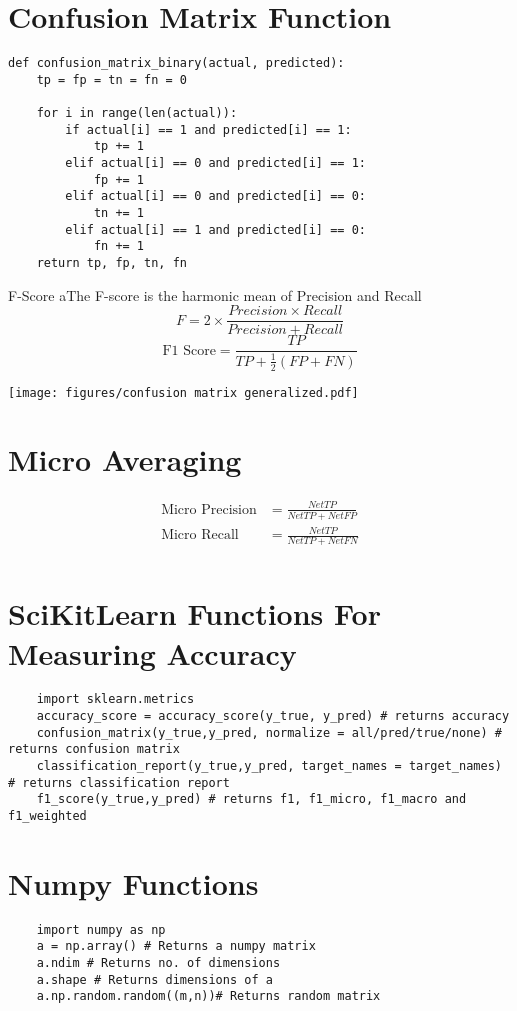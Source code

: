 \documentclass{report}
\begin{document}
\section{Confusion Matrix Function}
\begin{lstlisting}
def confusion_matrix_binary(actual, predicted):
    tp = fp = tn = fn = 0

    for i in range(len(actual)):
        if actual[i] == 1 and predicted[i] == 1:
            tp += 1
        elif actual[i] == 0 and predicted[i] == 1:
            fp += 1  
        elif actual[i] == 0 and predicted[i] == 0:
            tn += 1  
        elif actual[i] == 1 and predicted[i] == 0:
            fn += 1 
    return tp, fp, tn, fn
\end{lstlisting}
\begin{definition}{F-Score}
	aThe F-score is the harmonic mean of Precision and Recall
	\[
		F = 2 \times \frac{Precision \times Recall}{Precision + Recall}
	\]
	\[
		\text{F1 Score} = \frac{TP}{TP+ \frac{1}{2}(FP+FN)}
	\]
\end{definition}

\texttt{[image: figures/confusion matrix generalized.pdf]}
 
\section{Micro Averaging}
\begin{align*}
	\text{Micro Precision} &= \frac{Net TP}{Net TP + Net FP} \\
	\text{Micro Recall} &= \frac{Net TP}{Net TP + Net FN} \\
\end{align*}
\section{SciKitLearn Functions For Measuring Accuracy}
\begin{lstlisting}
	import sklearn.metrics
	accuracy_score = accuracy_score(y_true, y_pred) # returns accuracy
	confusion_matrix(y_true,y_pred, normalize = all/pred/true/none) # returns confusion matrix
	classification_report(y_true,y_pred, target_names = target_names) # returns classification report
	f1_score(y_true,y_pred) # returns f1, f1_micro, f1_macro and f1_weighted
\end{lstlisting}

\section{Numpy Functions}
\begin{lstlisting}
	import numpy as np
	a = np.array() # Returns a numpy matrix 
	a.ndim # Returns no. of dimensions
	a.shape # Returns dimensions of a
	a.np.random.random((m,n))# Returns random matrix
\end{lstlisting}
\end{document}
